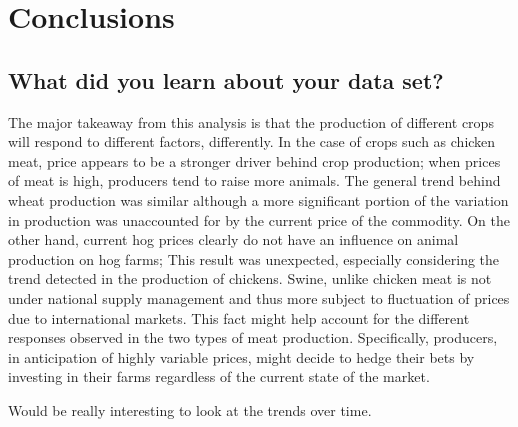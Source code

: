 \section{Conclusions}

\subsection{What did you learn about your data set?}

The major takeaway from this analysis is that the production of different crops will respond to different factors, differently.
In the case of crops such as chicken meat, price appears to be a stronger driver behind crop production; when prices of meat is high, producers tend to raise more animals.
The general trend behind wheat production was similar although a more significant portion of the variation in production was unaccounted for by the current price of the commodity.
On the other hand, current hog prices clearly do not have an influence on animal production on hog farms;
This result was unexpected, especially considering the trend detected in the production of chickens.
Swine, unlike chicken meat is not under national supply management and thus more subject to fluctuation of prices due to international markets.
This fact might help account for the different responses observed in the two types of meat production.
Specifically, producers, in anticipation of highly variable prices, might decide to hedge their bets by investing in their farms regardless of the current state of the market.





Would be really interesting to look at the trends over time.